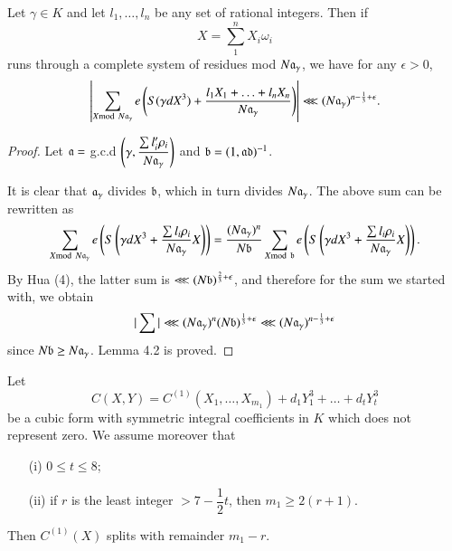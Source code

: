 \begin{lemma}%
Let $\gamma \in K$ and let $l_1, \ldots, l_n$ be any set of rational integers. Then if 
$$
X = \sum\limits^n_1 X_i \omega_i
$$
runs through a complete system of residues mod $N\mathfrak{a}_\gamma$, we have for any $\epsilon >0$,
$$
\left| \sum\limits_{X {\rm{mod}}\kern.3em N \mathfrak{a}_\gamma} e \left(S (\gamma d X^3)+ \frac{l_1 X_1 + \ldots + l_n X_n}{N\mathfrak{a}_\gamma} \right) \right| \lll (N\mathfrak{a}_\gamma)^{n - \frac{1}{3} + \epsilon}.
$$
\end{lemma}

\begin{proof}
Let $\mathfrak{a} =$ g.c.d  $\left(\gamma, \dfrac{\sum l'_i \rho_i}{N\mathfrak{a}_\gamma} \right)$ and $\mathfrak{b}=(1,\mathfrak{a}\mathfrak{d})^{-1}$.

It is clear that $\mathfrak{a}_\gamma$ divides $\mathfrak{b}$, which in turn divides $N\mathfrak{a}_\gamma$. The above sum can be rewritten as
{\fontsize{09pt}{11pt}\selectfont
$$
\sum\limits_{X {\rm{mod}}\kern.3em N \mathfrak{a}_\gamma} e \left( S \left(\gamma d X^3 + \dfrac{\sum l_i\rho_i}{N\mathfrak{a}_\gamma} X \right) \right) = \dfrac{(N\mathfrak{a}_\gamma)^n}{N\mathfrak{b}} \sum\limits_{X {\rm{mod}}\kern.3em \mathfrak{b}} e \left(S \left(\gamma d X^3 + \dfrac{\sum l_i \rho_i}{N \mathfrak{a}_\gamma} X\right) \right).
$$}\relax
By Hua (4), the latter sum is $\lll (N \mathfrak{b})^{\frac{2}{3}+ \epsilon}$, and therefore for the sum we started with, we obtain
$$
|\sum| \lll (N\mathfrak{a}_\gamma)^n (N\mathfrak{b})^{\frac{1}{3} + \epsilon} \lll (N\mathfrak{a}_\gamma)^{n - \frac{1}{3} + \epsilon}
$$
since $N\mathfrak{b} \geq N \mathfrak{a}_\gamma$. Lemma 4.2 is proved.
\end{proof}

\begin{lemma}%
Let 
$$
C (X,Y) =C^{(1)} (X_1, \ldots, X_{m_1}) + d_1 Y^3_1 + \ldots + d_t Y^3_t
$$
be a cubic form with symmetric integral coefficients in $K$ which does not represent zero. We assume moreover that
\begin{itemize}
\item[(i)] $0\leq t \leq 8$;

\item[(ii)] if $r$ is the least integer $> 7 -\dfrac{1}{2}t$, then $m_1 \geq 2 (r+1)$.
\end{itemize}
Then $C^{(1)} (X)$ splits with remainder $m_1 - r$.
\end{lemma}

